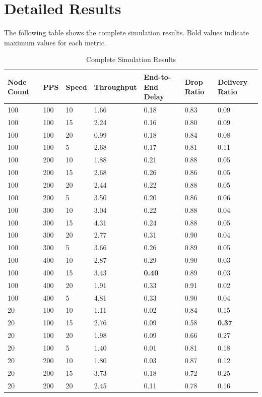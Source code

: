 \documentclass{article}
\begin{document}
\section{Detailed Results}
The following table shows the complete simulation results. Bold values indicate maximum values for each metric.
\begin{table}[h]
\centering\small
\caption{Complete Simulation Results}
\begin{tabular}{l l l l l l l}
\toprule
Node Count & PPS & Speed & Throughput & End-to-End Delay & Drop Ratio & Delivery Ratio \\
\midrule
100 & 100 & 10 & 1.66 & 0.18 & 0.83 & 0.09 \\
100 & 100 & 15 & 2.24 & 0.16 & 0.80 & 0.09 \\
100 & 100 & 20 & 0.99 & 0.18 & 0.84 & 0.08 \\
100 & 100 & 5 & 2.68 & 0.17 & 0.81 & 0.11 \\
100 & 200 & 10 & 1.88 & 0.21 & 0.88 & 0.05 \\
100 & 200 & 15 & 2.68 & 0.26 & 0.86 & 0.05 \\
100 & 200 & 20 & 2.44 & 0.22 & 0.88 & 0.05 \\
100 & 200 & 5 & 3.50 & 0.20 & 0.86 & 0.06 \\
100 & 300 & 10 & 3.04 & 0.22 & 0.88 & 0.04 \\
100 & 300 & 15 & 4.31 & 0.24 & 0.88 & 0.05 \\
100 & 300 & 20 & 2.77 & 0.31 & 0.90 & 0.04 \\
100 & 300 & 5 & 3.66 & 0.26 & 0.89 & 0.05 \\
100 & 400 & 10 & 2.87 & 0.29 & 0.90 & 0.03 \\
100 & 400 & 15 & 3.43 & \textbf{0.40} & 0.89 & 0.03 \\
100 & 400 & 20 & 1.91 & 0.33 & 0.91 & 0.02 \\
100 & 400 & 5 & 4.81 & 0.33 & 0.90 & 0.04 \\
20 & 100 & 10 & 1.11 & 0.02 & 0.84 & 0.15 \\
20 & 100 & 15 & 2.76 & 0.09 & 0.58 & \textbf{0.37} \\
20 & 100 & 20 & 1.98 & 0.09 & 0.66 & 0.27 \\
20 & 100 & 5 & 1.40 & 0.01 & 0.81 & 0.18 \\
20 & 200 & 10 & 1.80 & 0.03 & 0.87 & 0.12 \\
20 & 200 & 15 & 3.73 & 0.18 & 0.72 & 0.25 \\
20 & 200 & 20 & 2.45 & 0.11 & 0.78 & 0.16 \\

\end{tabular}
\end{table}
\end{document}
